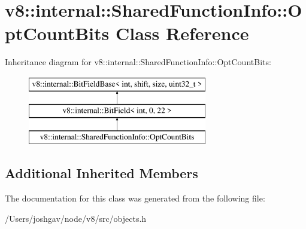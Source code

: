 \hypertarget{classv8_1_1internal_1_1_shared_function_info_1_1_opt_count_bits}{}\section{v8\+:\+:internal\+:\+:Shared\+Function\+Info\+:\+:Opt\+Count\+Bits Class Reference}
\label{classv8_1_1internal_1_1_shared_function_info_1_1_opt_count_bits}
Inheritance diagram for v8\+:\+:internal\+:\+:Shared\+Function\+Info\+:\+:Opt\+Count\+Bits\+:\begin{figure}[H]
\begin{center}
\leavevmode
\includegraphics[height=3.000000cm]{classv8_1_1internal_1_1_shared_function_info_1_1_opt_count_bits}
\end{center}
\end{figure}
\subsection*{Additional Inherited Members}


The documentation for this class was generated from the following file\+:\begin{DoxyCompactItemize}
\item 
/\+Users/joshgav/node/v8/src/objects.\+h\end{DoxyCompactItemize}

